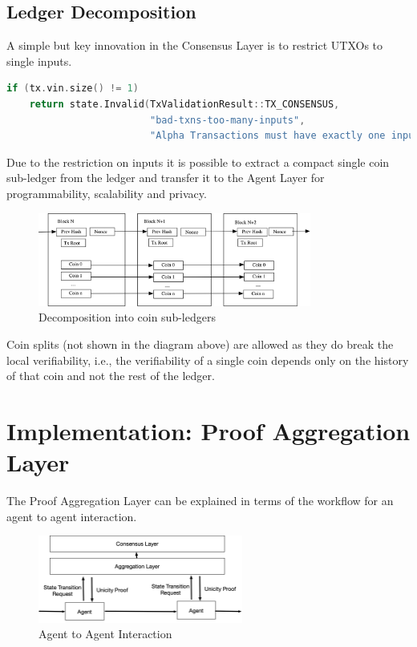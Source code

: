 \documentclass{article}
\begin{document}
\subsection{Ledger Decomposition}


A simple but key innovation in the Consensus Layer is to restrict UTXOs to single inputs.

\begin{minipage}{\linewidth}
\begin{lstlisting}[language=C++]
if (tx.vin.size() != 1)
    return state.Invalid(TxValidationResult::TX_CONSENSUS,
                         "bad-txns-too-many-inputs",
                         "Alpha Transactions must have exactly one input");
\end{lstlisting}
\end{minipage}

Due to the restriction on inputs it is possible to extract a compact single coin sub-ledger from the ledger and transfer it to the Agent Layer for programmability, scalability and privacy.

\begin{figure}[H]
    \centering
    \includegraphics[width=0.8\textwidth]{CoinLedger.png}
    \caption{Decomposition into coin sub-ledgers}
    \label{fig:coinledger}
\end{figure}


Coin splits (not shown in the diagram above) are allowed as they do break the local verifiability, i.e., the verifiability of a single coin depends only on the history of that coin and not the rest of the ledger.


\section{Implementation: Proof Aggregation Layer}

The Proof Aggregation Layer can be explained in terms of the workflow for an agent to agent interaction.

\begin{figure}[H]
    \centering
    \includegraphics[width=0.6\textwidth]{Workflow.png}
    \caption{Agent to Agent Interaction}
    \label{fig:Workflow}
\end{figure}
\end{document}
